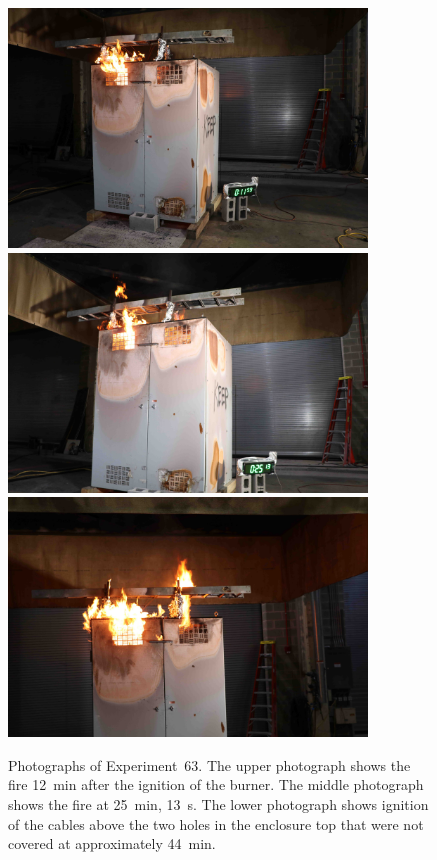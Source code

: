 \begin{figure}[p]
\centering
\includegraphics[height=2.50in]{../FIGURES/Test_63_11_min_59_s} \\
\includegraphics[height=2.50in]{../FIGURES/Test_63_25_min_13_s} \\
\includegraphics[height=2.50in]{../FIGURES/Test_63_ignition}
\caption[Photographs of Experiment~63]{Photographs of Experiment~63. The upper photograph shows the fire 12~min after the ignition of the burner. The middle photograph shows the fire at 25~min, 13~s. The lower photograph shows ignition of the cables above the two holes in the enclosure top that were not covered at approximately 44~min.}
\label{fig:Test_63_photos}
\end{figure}


